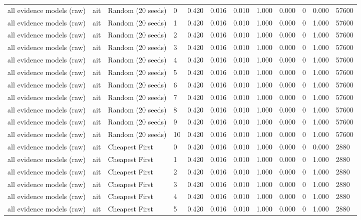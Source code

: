 \begin{table}[!ht]
{\begin{tabular}{llllllllllll}
all evidence models (raw) & ait & Random (20 seeds) & 0 & 0.420 & 0.016 & 0.010 & 1.000 & 0.000 & 0 & 0.000 & 57600 \\
all evidence models (raw) & ait & Random (20 seeds) & 1 & 0.420 & 0.016 & 0.010 & 1.000 & 0.000 & 0 & 1.000 & 57600 \\
all evidence models (raw) & ait & Random (20 seeds) & 2 & 0.420 & 0.016 & 0.010 & 1.000 & 0.000 & 0 & 1.000 & 57600 \\
all evidence models (raw) & ait & Random (20 seeds) & 3 & 0.420 & 0.016 & 0.010 & 1.000 & 0.000 & 0 & 1.000 & 57600 \\
all evidence models (raw) & ait & Random (20 seeds) & 4 & 0.420 & 0.016 & 0.010 & 1.000 & 0.000 & 0 & 1.000 & 57600 \\
all evidence models (raw) & ait & Random (20 seeds) & 5 & 0.420 & 0.016 & 0.010 & 1.000 & 0.000 & 0 & 1.000 & 57600 \\
all evidence models (raw) & ait & Random (20 seeds) & 6 & 0.420 & 0.016 & 0.010 & 1.000 & 0.000 & 0 & 1.000 & 57600 \\
all evidence models (raw) & ait & Random (20 seeds) & 7 & 0.420 & 0.016 & 0.010 & 1.000 & 0.000 & 0 & 1.000 & 57600 \\
all evidence models (raw) & ait & Random (20 seeds) & 8 & 0.420 & 0.016 & 0.010 & 1.000 & 0.000 & 0 & 1.000 & 57600 \\
all evidence models (raw) & ait & Random (20 seeds) & 9 & 0.420 & 0.016 & 0.010 & 1.000 & 0.000 & 0 & 1.000 & 57600 \\
all evidence models (raw) & ait & Random (20 seeds) & 10 & 0.420 & 0.016 & 0.010 & 1.000 & 0.000 & 0 & 1.000 & 57600 \\
all evidence models (raw) & ait & Cheapest First & 0 & 0.420 & 0.016 & 0.010 & 1.000 & 0.000 & 0 & 0.000 & 2880 \\
all evidence models (raw) & ait & Cheapest First & 1 & 0.420 & 0.016 & 0.010 & 1.000 & 0.000 & 0 & 1.000 & 2880 \\
all evidence models (raw) & ait & Cheapest First & 2 & 0.420 & 0.016 & 0.010 & 1.000 & 0.000 & 0 & 1.000 & 2880 \\
all evidence models (raw) & ait & Cheapest First & 3 & 0.420 & 0.016 & 0.010 & 1.000 & 0.000 & 0 & 1.000 & 2880 \\
all evidence models (raw) & ait & Cheapest First & 4 & 0.420 & 0.016 & 0.010 & 1.000 & 0.000 & 0 & 1.000 & 2880 \\
all evidence models (raw) & ait & Cheapest First & 5 & 0.420 & 0.016 & 0.010 & 1.000 & 0.000 & 0 & 1.000 & 2880 \\

\end{tabular}}
\end{table}

